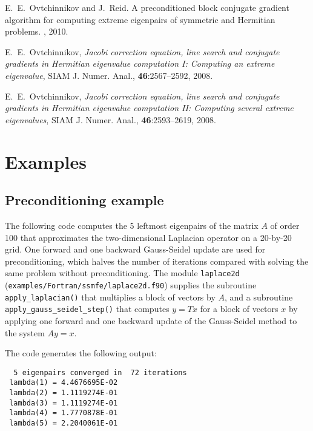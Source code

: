 
E.~E.~Ovtchinnikov and J.~Reid.
A preconditioned block conjugate gradient
algorithm for computing extreme eigenpairs
of symmetric and Hermitian problems.
\report, 2010.

E.~E.~Ovtchinnikov,
{\em Jacobi correction equation, line search and
conjugate gradients in Hermitian eigenvalue computation I:
Computing an extreme eigenvalue},
SIAM J. Numer. Anal., {\bf 46}:2567--2592, 2008.

E.~E.~Ovtchinnikov,
{\em Jacobi correction equation, line search and
conjugate gradients in Hermitian eigenvalue computation II:
Computing several extreme eigenvalues},
SIAM J. Numer. Anal., {\bf 46}:2593--2619, 2008.

\section{Examples}

\subsection{Preconditioning example}
\label{sec:ex.prec}

The following code 
computes the 5 leftmost eigenpairs of 
the matrix $A$ of order 100 that approximates 
the two-dimensional Laplacian operator
on a 20-by-20 grid.
One forward and one backward Gauss-Seidel update
are used for preconditioning,
which halves the number of iterations
compared with solving the same problem without preconditioning.
The module {\tt laplace2d} (\texttt{examples/Fortran/ssmfe/laplace2d.f90})
supplies the subroutine {\tt apply\_laplacian()}
that multiplies a block of vectors by $A$,
and a subroutine 
{\tt apply\_gauss\_seidel\_step()}
that computes $y = T x$ for a block of vectors $x$
by applying one forward and one backward update
of the Gauss-Seidel method to the system $A y = x$.

The code generates the following output:
\begin{verbatim}
  5 eigenpairs converged in  72 iterations
 lambda(1) = 4.4676695E-02
 lambda(2) = 1.1119274E-01
 lambda(3) = 1.1119274E-01
 lambda(4) = 1.7770878E-01
 lambda(5) = 2.2040061E-01
\end{verbatim}

